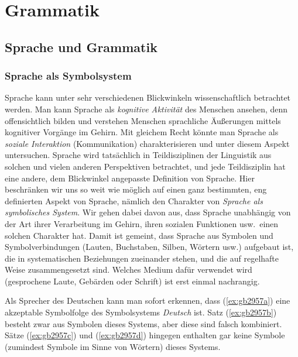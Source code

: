 \chapter{Grammatik}

\label{sec:grammatik}

\section{Sprache und Grammatik}

\label{sec:spracheundgrammatik}

\subsection{Sprache als Symbolsystem}

\label{sec:sprachealssymbolsystem}


Sprache kann unter sehr verschiedenen Blickwinkeln wissenschaftlich betrachtet werden.
Man kann Sprache als \textit{kognitive Aktivität} des Menschen ansehen, denn offensichtlich bilden und verstehen Menschen sprachliche Äußerungen mittels kognitiver Vorgänge im Gehirn.
Mit gleichem Recht könnte man Sprache als \textit{soziale Interaktion} (Kommunikation) charakterisieren und unter diesem Aspekt untersuchen.
Sprache wird tatsächlich in Teildisziplinen der Linguistik aus solchen und vielen anderen Perspektiven betrachtet, und jede Teildisziplin hat eine andere, dem Blickwinkel angepasste Definition von Sprache.
Hier beschränken wir uns so weit wie möglich auf einen ganz bestimmten, eng definierten Aspekt von Sprache, nämlich den Charakter von \textit{Sprache als symbolisches System}.
Wir gehen dabei davon aus, dass Sprache unabhängig von der Art ihrer Verarbeitung im Gehirn, ihren sozialen Funktionen usw.\ einen solchen Charakter hat.
Damit ist gemeint, dass Sprache aus Symbolen und Symbolverbindungen (Lauten, Buchstaben, Silben, Wörtern usw.) aufgebaut ist, die in systematischen Beziehungen zueinander stehen, und die auf regelhafte Weise zusammengesetzt sind.
Welches Medium dafür verwendet wird (\zB gesprochene Laute, Gebärden oder Schrift) ist erst einmal nachrangig.

Als Sprecher des Deutschen kann man \zB sofort erkennen, dass (\ref{ex:gb2957a}) eine akzeptable Symbolfolge des Symbolsystems \textit{Deutsch} ist.
Satz (\ref{ex:gb2957b}) besteht zwar aus Symbolen dieses Systems, aber diese sind falsch kombiniert.
Sätze (\ref{ex:gb2957c}) und (\ref{ex:gb2957d}) hingegen enthalten gar keine Symbole (zumindest Symbole im Sinne von Wörtern) dieses Systems.

